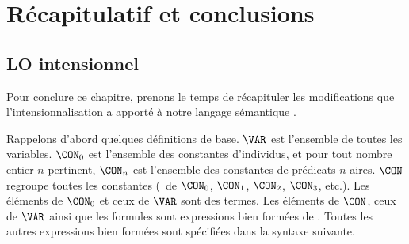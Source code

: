 


\section{Récapitulatif et conclusions}
\subsection{{LO} intensionnel}
\label{ss:LOInt}

Pour conclure ce chapitre, prenons le temps de récapituler les modifications que l'intensionnalisation a apporté à notre langage sémantique {\LO}. 

Rappelons d'abord quelques définitions de base. $\VAR$ est l'ensemble de toutes les variables. 
$\CON_0$ est l'ensemble des constantes d'individus, et pour tout nombre entier $n$ pertinent,  $\CON_n$ est l'ensemble des constantes de prédicats $n$-aires. 
$\CON$ regroupe toutes les constantes (\ie\ de $\CON_0$, $\CON_1$, $\CON_2$, $\CON_3$, etc.).
Les éléments de $\CON_0$ et ceux de $\VAR$ sont des termes. 
Les éléments de $\CON$, ceux de $\VAR$ ainsi que les formules sont expressions bien formées de {\LO}.  Toutes les autres expressions bien formées sont spécifiées dans la syntaxe suivante.

\largerpage[-1]

